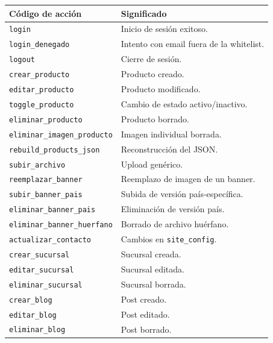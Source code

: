 \documentclass[11pt,a4paper]{article}
\begin{document}
\begin{longtable}{p{5.5cm} p{9cm}}
\toprule
\textbf{Código de acción} & \textbf{Significado} \\
\midrule
\endhead
\texttt{login}                       & Inicio de sesión exitoso. \\
\texttt{login\_denegado}             & Intento con email fuera de la whitelist. \\
\texttt{logout}                      & Cierre de sesión. \\
\texttt{crear\_producto}             & Producto creado. \\
\texttt{editar\_producto}            & Producto modificado. \\
\texttt{toggle\_producto}            & Cambio de estado activo/inactivo. \\
\texttt{eliminar\_producto}          & Producto borrado. \\
\texttt{eliminar\_imagen\_producto}  & Imagen individual borrada. \\
\texttt{rebuild\_products\_json}     & Reconstrucción del JSON. \\
\texttt{subir\_archivo}              & Upload genérico. \\
\texttt{reemplazar\_banner}          & Reemplazo de imagen de un banner. \\
\texttt{subir\_banner\_pais}         & Subida de versión país-específica. \\
\texttt{eliminar\_banner\_pais}      & Eliminación de versión país. \\
\texttt{eliminar\_banner\_huerfano}  & Borrado de archivo huérfano. \\
\texttt{actualizar\_contacto}        & Cambios en \texttt{site\_config}. \\
\texttt{crear\_sucursal}             & Sucursal creada. \\
\texttt{editar\_sucursal}            & Sucursal editada. \\
\texttt{eliminar\_sucursal}          & Sucursal borrada. \\
\texttt{crear\_blog}                 & Post creado. \\
\texttt{editar\_blog}                & Post editado. \\
\texttt{eliminar\_blog}              & Post borrado. \\
\bottomrule
\end{longtable}

\end{document}

